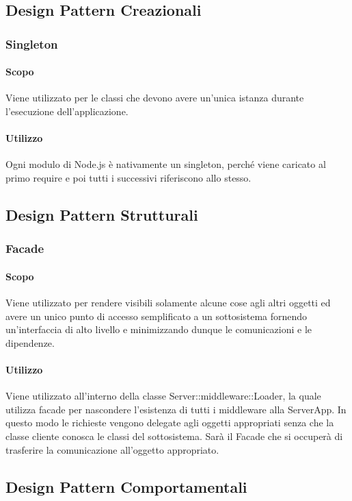 \documentclass[12pt,a4paper]{article}
\begin{document}
\subsection{Design Pattern Creazionali}

\subsubsection{Singleton}
\paragraph{Scopo}
Viene utilizzato per le classi che devono avere un’unica istanza durante l’esecuzione dell’applicazione.
\paragraph{Utilizzo}
Ogni modulo di Node.js è nativamente un singleton, perché viene caricato al primo require e poi tutti i successivi riferiscono allo stesso.

\subsection{Design Pattern Strutturali}

\subsubsection{Facade}
\paragraph{Scopo}
Viene utilizzato per rendere visibili solamente alcune cose agli altri oggetti ed avere un unico punto di accesso semplificato a un sottosistema fornendo un’interfaccia di alto livello e minimizzando dunque le comunicazioni e le dipendenze.
\paragraph{Utilizzo}
Viene utilizzato all’interno della classe Server::middleware::Loader, la quale utilizza facade per nascondere l’esistenza di tutti i middleware alla ServerApp. In questo modo le richieste vengono delegate agli oggetti appropriati senza che la classe cliente conosca le classi del sottosistema. Sarà il Facade che si occuperà di trasferire la comunicazione all’oggetto appropriato.

\subsection{Design Pattern Comportamentali}
\end{document}

